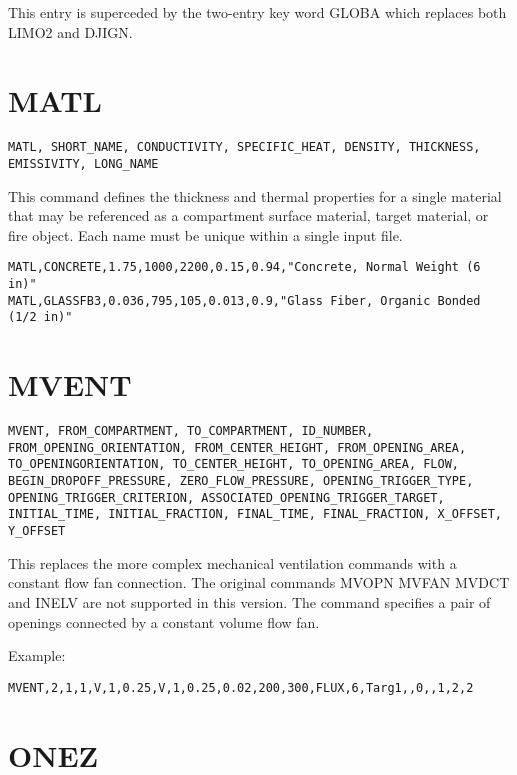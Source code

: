 This entry is superceded by the two-entry key word GLOBA which replaces both LIMO2 and DJIGN.

\section{MATL}

\begin{lstlisting}
MATL, SHORT_NAME, CONDUCTIVITY, SPECIFIC_HEAT, DENSITY, THICKNESS, EMISSIVITY, LONG_NAME
\end{lstlisting}

This command defines the thickness and thermal properties for a single material that may be referenced as a compartment surface material, target material, or fire object. Each name must be unique within a single input file.

\begin{lstlisting}
MATL,CONCRETE,1.75,1000,2200,0.15,0.94,"Concrete, Normal Weight (6 in)"
MATL,GLASSFB3,0.036,795,105,0.013,0.9,"Glass Fiber, Organic Bonded (1/2 in)"
\end{lstlisting}

\section{MVENT}

\begin{lstlisting}
MVENT, FROM_COMPARTMENT, TO_COMPARTMENT, ID_NUMBER, FROM_OPENING_ORIENTATION, FROM_CENTER_HEIGHT, FROM_OPENING_AREA, TO_OPENINGORIENTATION, TO_CENTER_HEIGHT, TO_OPENING_AREA, FLOW, BEGIN_DROPOFF_PRESSURE, ZERO_FLOW_PRESSURE, OPENING_TRIGGER_TYPE, OPENING_TRIGGER_CRITERION, ASSOCIATED_OPENING_TRIGGER_TARGET, INITIAL_TIME, INITIAL_FRACTION, FINAL_TIME, FINAL_FRACTION, X_OFFSET, Y_OFFSET
\end{lstlisting}

This replaces the more complex mechanical ventilation commands with a constant flow fan connection.  The original commands MVOPN MVFAN MVDCT and INELV are not supported in this version. The command specifies a pair of openings connected by a constant volume flow fan.

Example:

\begin{lstlisting}
MVENT,2,1,1,V,1,0.25,V,1,0.25,0.02,200,300,FLUX,6,Targ1,,0,,1,2,2
\end{lstlisting}

\section{ONEZ}

